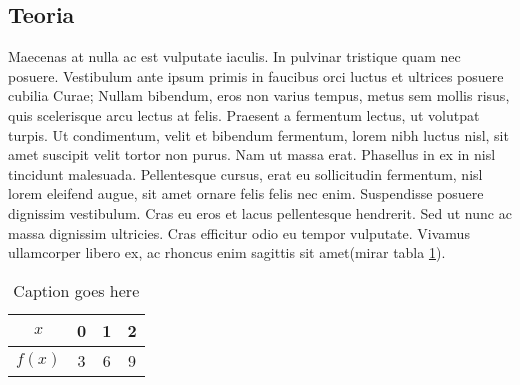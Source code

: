\documentclass[11pt]{article}
\begin{document}
\subsection{Teoria}

Maecenas at nulla ac est vulputate iaculis. In pulvinar tristique quam nec posuere. Vestibulum ante ipsum primis in faucibus orci luctus et ultrices posuere cubilia Curae; Nullam bibendum, eros non varius tempus, metus sem mollis risus, quis scelerisque arcu lectus at felis. Praesent a fermentum lectus, ut volutpat turpis. Ut condimentum, velit et bibendum fermentum, lorem nibh luctus nisl, sit amet suscipit velit tortor non purus. Nam ut massa erat. Phasellus in ex in nisl tincidunt malesuada. Pellentesque cursus, erat eu sollicitudin fermentum, nisl lorem eleifend augue, sit amet ornare felis felis nec enim. Suspendisse posuere dignissim vestibulum. Cras eu eros et lacus pellentesque hendrerit. Sed ut nunc ac massa dignissim ultricies. Cras efficitur odio eu tempor vulputate. Vivamus ullamcorper libero ex, ac rhoncus enim sagittis sit amet(mirar tabla \ref{tab:data1}).

\begin{table}[H]
	\centering
		\begin{tabular}{|c|c|c|c|}\hline
		$x$ &0&1&2\\ \hline
		$f(x)$ &3&6&9\\ \hline		
		\end{tabular}
	\caption{Caption goes here}
	\label{tab:data1}
\end{table}



\clearpage

\nocite{*}

\end{document}
